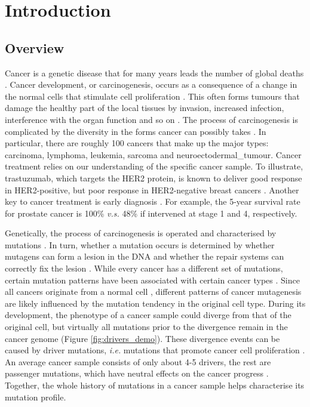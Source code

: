 \chapter{Introduction}\label{intro}

\section{Overview}

Cancer is a genetic disease that for many years leads the number of global deaths \citep{Bray2021TheWorldwide}. Cancer development, or carcinogenesis, occurs as a consequence of a change in the normal cells that stimulate cell proliferation \citep{Weinberg1996HowArises}. This often forms tumours that damage the healthy part of the local tissues by invasion, increased infection, interference with the organ function and so on \citep{Tobias2014CancerManagement}. The process of carcinogenesis is complicated by the diversity in the forms cancer can possibly takes \citep{weinberg2013biology}. In particular, there are roughly 100 cancers that make up the major types: \gls{carcinoma}, \gls{lymphoma}, \gls{leukemia}, \gls{sarcoma} and \gls{neuroectodermal_tumour}. Cancer treatment relies on our understanding of the specific cancer sample. To illustrate, trastuzumab, which targets the HER2 protein, is known to deliver good response in HER2-positive, but poor response in HER2-negative breast cancers \citep{Kreutzfeldt2020TheTherapies}. Another key to cancer treatment is early diagnosis \citep{Hawkes2019CancerDiagnosis}. For example, the 5-year survival rate for prostate cancer is 100\% \textit{v.s.} 48\% if intervened at stage 1 and 4, respectively. 

Genetically, the process of \gls{carcinogenesis} is operated and characterised by mutations \citep{Stratton2009}. In turn, whether a mutation occurs is determined by whether mutagens can form a \gls{lesion} in the DNA and whether the repair systems can correctly fix the lesion \citep{Chatterjee2017MechanismsMutagenesis}. While every cancer has a different set of mutations, certain mutation patterns have been associated with certain cancer types \citep{Alexandrov2013,Polak2015,Campbell2020}. Since all cancers originate from a normal cell \citep{Hanahan2011HallmarksGeneration}, different patterns of cancer \gls{mutagenesis} are likely influenced by the mutation tendency in the original cell type. During its development, the phenotype of a cancer sample could diverge from that of the original cell, but virtually all mutations prior to the divergence remain in the cancer genome (Figure \ref{fig:drivers_demo}). These divergence events can be caused by driver mutations, \textit{i.e.} mutations that promote cancer cell proliferation \citep{Pon2015}. An average cancer sample consists of only about 4-5 drivers, the rest are passenger mutations, which have neutral effects on the cancer progress \citep{Campbell2020}. Together, the whole history of mutations in a cancer sample helps characterise its mutation profile. 

